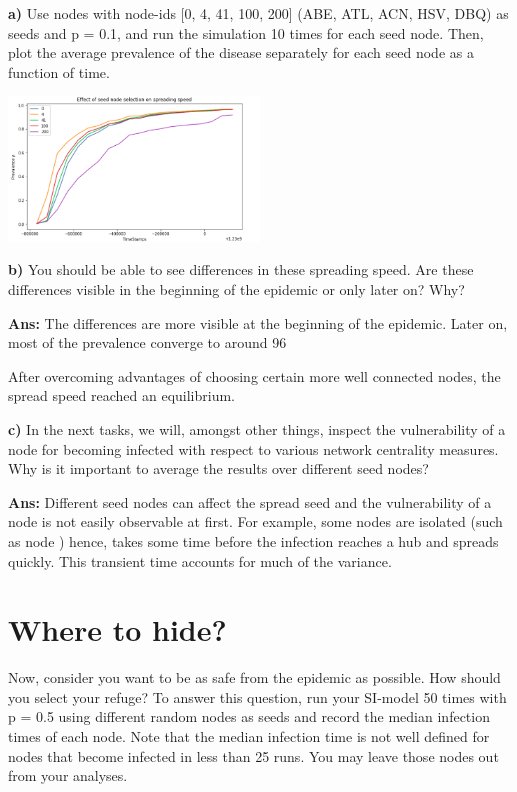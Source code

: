 \documentclass[a4paper,12pt]{article}
\begin{document}
\bigskip
\textbf{a)} Use nodes with node-ids [0, 4, 41, 100, 200] (ABE, ATL, ACN, HSV, DBQ) as
seeds and p = 0.1, and run the simulation 10 times for each seed node. Then, plot the
average prevalence of the disease separately for each seed node as a function of time.

\begin{center}
\includegraphics[width=0.5\textwidth]{q3}
\end{center}

\textbf{b)} You should be able to see differences in these spreading speed. Are these differences visible in the beginning of the epidemic or only later on? Why?

\bigskip
\textbf{Ans: }The differences are more visible at the beginning of the epidemic. Later on, most of the prevalence converge to around 96%

After overcoming advantages of choosing certain more well connected nodes, the spread speed reached an equilibrium.

\bigskip
\textbf{c)} In the next tasks, we will, amongst other things, inspect the vulnerability of a node for becoming infected with respect to various network centrality measures. Why is it important to average the results over different seed nodes?

\bigskip
\textbf{Ans: }Different seed nodes can affect the spread seed and the vulnerability of a node is not easily observable at first. For example, some nodes are isolated (such as node )
hence, takes some
time before the infection reaches a hub and spreads quickly. This transient time accounts for
much of the variance.

\section{Where to hide?}
Now, consider you want to be as safe from the epidemic as possible. How should you select
your refuge? To answer this question, run your SI-model 50 times with p = 0.5 using different
random nodes as seeds and record the median infection times of each node. Note that the
median infection time is not well defined for nodes that become infected in less than 25 runs.
You may leave those nodes out from your analyses.
\end{document}
